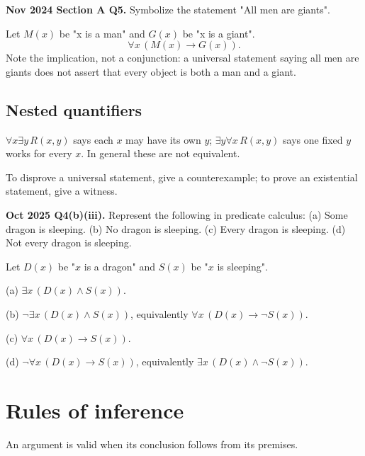 \documentclass[11pt,a4paper]{article}
\begin{document}
\begin{pyqbox}
\textbf{Nov 2024 Section A Q5.} Symbolize the statement "All men are giants".
\end{pyqbox}

\begin{solbox}
Let $M(x)$ be "x is a man" and $G(x)$ be "x is a giant".
\[
\forall x\,(M(x)\to G(x)).
\]
Note the implication, not a conjunction: a universal statement saying all men are giants does not assert that every object is both a man and a giant.
\end{solbox}

\subsection{Nested quantifiers}
$\forall x\exists y\,R(x,y)$ says each $x$ may have its own $y$; $\exists y\forall x\,R(x,y)$ says one fixed $y$ works for every $x$. In general these are not equivalent.

To disprove a universal statement, give a counterexample; to prove an existential statement, give a witness.

\begin{pyqbox}
\textbf{Oct 2025 Q4(b)(iii).} Represent the following in predicate calculus: (a) Some dragon is sleeping. (b) No dragon is sleeping. (c) Every dragon is sleeping. (d) Not every dragon is sleeping.
\end{pyqbox}

\begin{solbox}
Let $D(x)$ be "$x$ is a dragon" and $S(x)$ be "$x$ is sleeping".

(a) $\exists x\,(D(x)\land S(x))$.

(b) $\neg\exists x\,(D(x)\land S(x))$, equivalently $\forall x\,(D(x)\to\neg S(x))$.

(c) $\forall x\,(D(x)\to S(x))$.

(d) $\neg\forall x\,(D(x)\to S(x))$, equivalently $\exists x\,(D(x)\land\neg S(x))$.
\end{solbox}

\section{Rules of inference}

An argument is valid when its conclusion follows from its premises.
\end{document}
